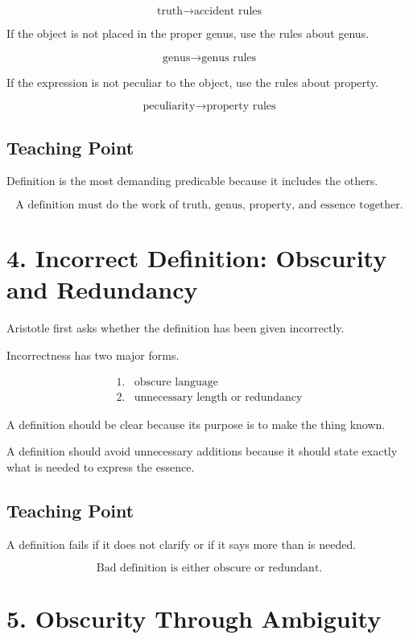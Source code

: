 \documentclass[12pt]{article}
\begin{document}
\[
\text{truth} \rightarrow \text{accident rules}
\]

If the object is not placed in the proper genus, use the rules about genus.

\[
\text{genus} \rightarrow \text{genus rules}
\]

If the expression is not peculiar to the object, use the rules about property.

\[
\text{peculiarity} \rightarrow \text{property rules}
\]

\subsection*{Teaching Point}

Definition is the most demanding predicable because it includes the others.

\[
\boxed{
\text{A definition must do the work of truth, genus, property, and essence together.}
}
\]

\section*{4. Incorrect Definition: Obscurity and Redundancy}

Aristotle first asks whether the definition has been given incorrectly.

Incorrectness has two major forms.

\[
\begin{array}{ll}
1. & \text{obscure language} \\
2. & \text{unnecessary length or redundancy}
\end{array}
\]

A definition should be clear because its purpose is to make the thing known.

A definition should avoid unnecessary additions because it should state exactly
what is needed to express the essence.

\subsection*{Teaching Point}

A definition fails if it does not clarify or if it says more than is needed.

\[
\boxed{
\text{Bad definition is either obscure or redundant.}
}
\]

\section*{5. Obscurity Through Ambiguity}
\end{document}

